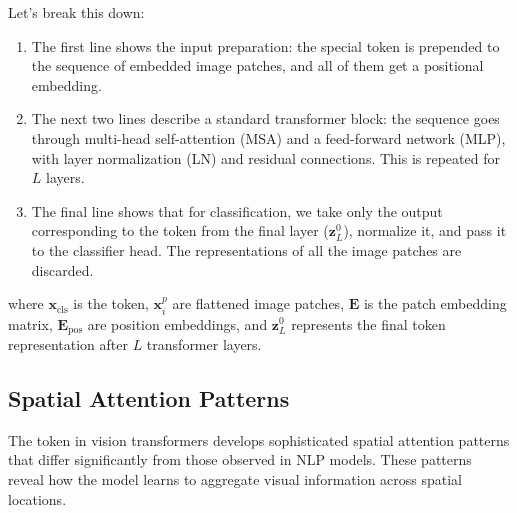 Let's break this down:
\begin{enumerate}
\item The first line shows the input preparation: the special \cls{} token is prepended to the sequence of embedded image patches, and all of them get a positional embedding.
\item The next two lines describe a standard transformer block: the sequence goes through multi-head self-attention (MSA) and a feed-forward network (MLP), with layer normalization (LN) and residual connections. This is repeated for $L$ layers.
\item The final line shows that for classification, we take only the output corresponding to the \cls{} token from the final layer ($\mathbf{z}_L^0$), normalize it, and pass it to the classifier head. The representations of all the image patches are discarded.
\end{enumerate}

where $\mathbf{x}_{\text{cls}}$ is the \cls{} token, $\mathbf{x}_i^p$ are flattened image patches, $\mathbf{E}$ is the patch embedding matrix, $\mathbf{E}_{\text{pos}}$ are position embeddings, and $\mathbf{z}_L^0$ represents the final \cls{} token representation after $L$ transformer layers.

\subsection{Spatial Attention Patterns}

The \cls{} token in vision transformers develops sophisticated spatial attention patterns that differ significantly from those observed in NLP models. These patterns reveal how the model learns to aggregate visual information across spatial locations.

